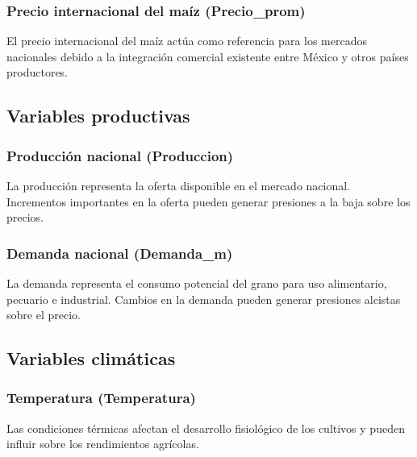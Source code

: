 \documentclass[11pt]{article}
\begin{document}
\hypertarget{precio-internacional-del-mauxedz-precio_prom}{%
\subsubsection{Precio internacional del maíz
(Precio\_prom)}\label{precio-internacional-del-mauxedz-precio_prom}}

El precio internacional del maíz actúa como referencia para los mercados
nacionales debido a la integración comercial existente entre México y
otros países productores.

\hypertarget{variables-productivas}{%
\subsection{Variables productivas}\label{variables-productivas}}

\hypertarget{producciuxf3n-nacional-produccion}{%
\subsubsection{Producción nacional
(Produccion)}\label{producciuxf3n-nacional-produccion}}

La producción representa la oferta disponible en el mercado nacional.
Incrementos importantes en la oferta pueden generar presiones a la baja
sobre los precios.

\hypertarget{demanda-nacional-demanda_m}{%
\subsubsection{Demanda nacional
(Demanda\_m)}\label{demanda-nacional-demanda_m}}

La demanda representa el consumo potencial del grano para uso
alimentario, pecuario e industrial. Cambios en la demanda pueden generar
presiones alcistas sobre el precio.

\hypertarget{variables-climuxe1ticas}{%
\subsection{Variables climáticas}\label{variables-climuxe1ticas}}

\hypertarget{temperatura-temperatura}{%
\subsubsection{Temperatura
(Temperatura)}\label{temperatura-temperatura}}

Las condiciones térmicas afectan el desarrollo fisiológico de los
cultivos y pueden influir sobre los rendimientos agrícolas.
\end{document}
